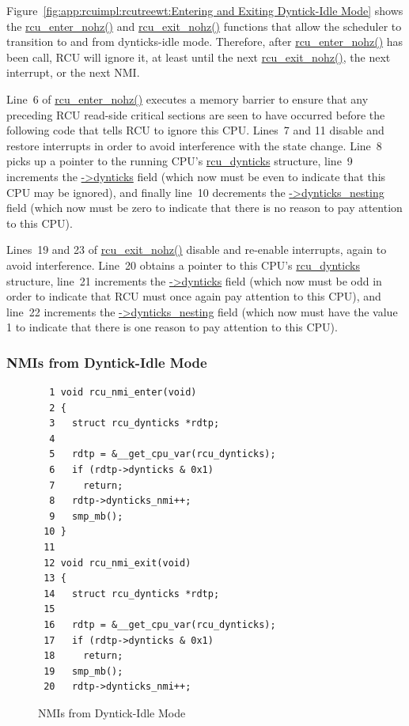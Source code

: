 Figure~\ref{fig:app:rcuimpl:rcutreewt:Entering and Exiting Dyntick-Idle Mode}
shows the \url{rcu_enter_nohz()} and \url{rcu_exit_nohz()} functions
that allow the scheduler to transition to and from dynticks-idle
mode.
Therefore, after \url{rcu_enter_nohz()} has been call, RCU will ignore
it, at least until the next \url{rcu_exit_nohz()}, the next interrupt,
or the next NMI.

Line~6 of \url{rcu_enter_nohz()} executes a memory barrier to ensure
that any preceding RCU read-side critical sections are seen to have
occurred before the following code that tells RCU to ignore this CPU.
Lines~7 and 11 disable and restore interrupts in order to avoid
interference with the state change.
Line~8 picks up a pointer to the running CPU's \url{rcu_dynticks}
structure, line~9 increments the \url{->dynticks} field (which now
must be even to indicate that this CPU may be ignored), and finally line~10
decrements the \url{->dynticks_nesting} field (which now must be
zero to indicate that there is no reason to pay attention to this CPU).

Lines~19 and 23 of \url{rcu_exit_nohz()} disable and re-enable interrupts,
again to avoid interference.
Line~20 obtains a pointer to this CPU's \url{rcu_dynticks} structure,
line~21 increments the \url{->dynticks} field (which now must be odd
in order to indicate that RCU must once again pay attention to this
CPU), and line~22 increments the \url{->dynticks_nesting} field
(which now must have the value 1 to indicate that there is one
reason to pay attention to this CPU).

\subsubsection{NMIs from Dyntick-Idle Mode}
\label{app:rcuimpl:rcutreewt:NMIs from Dyntick-Idle Mode}

\begin{figure}[tbp]
{ \scriptsize
\begin{verbatim}
  1 void rcu_nmi_enter(void)
  2 {
  3   struct rcu_dynticks *rdtp;
  4
  5   rdtp = &__get_cpu_var(rcu_dynticks);
  6   if (rdtp->dynticks & 0x1)
  7     return;
  8   rdtp->dynticks_nmi++;
  9   smp_mb();
 10 }
 11
 12 void rcu_nmi_exit(void)
 13 {
 14   struct rcu_dynticks *rdtp;
 15
 16   rdtp = &__get_cpu_var(rcu_dynticks);
 17   if (rdtp->dynticks & 0x1)
 18     return;
 19   smp_mb();
 20   rdtp->dynticks_nmi++;
\end{verbatim}
}
\caption{NMIs from Dyntick-Idle Mode}
\label{fig:app:rcuimpl:rcutreewt:NMIs from Dyntick-Idle Mode}
\end{figure}

